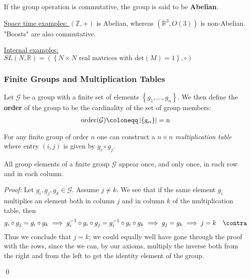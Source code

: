 \begin{definition}
    If the group operation is commutative, the group is said to be \textbf{Abelian}. 
\end{definition}

\underline{Space time examples: }\((\mathbb{Z} , +)\) is Abelian, whereas \((\mathbb{R} ^3, O(3))\) is non-Abelian. "Boosts" are also commutative.

\underline{Internal examples:} \(SL(N, \mathbb{R} ) = (\left\{ N\times N \text{ real matrices with det}(M) = 1  \right\}, \circ )\)  

\subsubsection{Finite Groups and Multiplication Tables}
\begin{definition}
    Let \(\mathcal{G}\) be a group with a finite set of elements \(\left\{ g_1, \dots , g_n \right\} \). We then define the \textbf{order} of the group to be the cardinality of the set of group members: \begin{align*}
        \rm{order}(\mathcal{G} ) \coloneqq \left| \left\{ g_{\alpha } \right\}  \right|  = n 
    \end{align*} 
\end{definition}

For any finite group of order \(n\) one can construct a \(n \times n\) \textit{multiplication table} where entry \((i, j)\) is given by \(g_i \circ g_j\). 

\begin{theorem}
    All group elements of a finite group \(\mathcal{G}\) appear once, and only once, in each row and in each column.  
\end{theorem}
\textit{Proof:} Let \(g_i, g_j, g_k \in \mathcal{G}\). Assume \(j \neq k\). We see that if the same element \(g_i\) multiplies an element both in column \(j\) and in column \(k\) of the multiplication table, then  
\begin{align*}
    g_i \circ  g_j = g_i \circ  g_k \implies  g_i ^{-1}\circ  g_i \circ  g_j = g_i ^{-1} \circ  g_i \circ g_k \implies g_j = g_k \implies j = k\quad \contra
\end{align*} 
Thus we conclude that \(j = k\); we could equally well have gone through the proof with the rows, since the we can, by our axioms, multiply the inverse both from the right and from the left to get the identity element of the group.

\hfill \qed 

